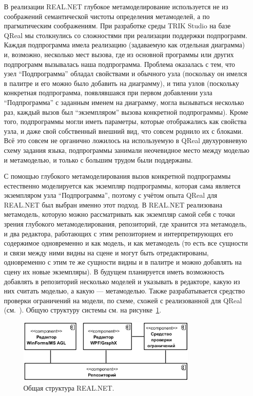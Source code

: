 \documentclass{spisok-article}
\begin{document}
В реализации REAL.NET глубокое метамоделирование используется не из соображений семантической чистоты определения метамоделей, а по прагматическим соображениям. При разработке среды TRIK Studio на базе QReal мы столкнулись со сложностями при реализации поддержки подпрограмм. Каждая подпрограмма имела реализацию (задаваемую как отдельная диаграмма) и, возможно, несколько мест вызова, где из основной программы или других подпрограмм вызывалась наша подпрограмма. Проблема оказалась с тем, что узел ``Подпрограмма'' обладал свойствами и обычного узла (поскольку он имелся в палитре и его можно было добавить на диаграмму), и типа узлов (поскольку конкретная подпрограмма, появлявшаяся при первом добавлении узла ``Подпрограмма'' с заданным именем на диаграмму, могла вызываться несколько раз, каждый вызов был ``экземпляром'' вызова конкретной подпрограммы). Кроме того, подпрограммы могли иметь параметры, которые отображались как свойства узла, и даже свой собственный внешний вид, что совсем роднило их с блоками. Всё это совсем не органично ложилось на используемую в QReal двухуровневую схему задания языка, подпрограммы занимали неочевидное место между моделью и метамоделью, и только с большим трудом были поддержаны.

С помощью глубокого метамоделирования вызов конкретной подпрограммы естественно моделируется как экземпляр подпрограммы, которая сама является экземпляром узла ``Подпрограмма'', поэтому с учётом опыта QReal для REAL.NET был выбран именно этот подход. В REAL.NET реализована метамодель, которую можно рассматривать как экземпляр самой себя с точки зрения глубокого метамоделирования, репозиторий, где хранится эта метамодель, и два редактора, работающих с этим репозиторием и интерпретирующих его содержимое одновременно и как модель, и как метамодель (то есть все сущности и связи между ними видны на сцене и могут быть отредактированы, одновременно с этим те же сущности видны и в палитре и можно добавлять на сцену их новые экземпляры). В будущем планируется иметь возможность добавлять в репозиторий несколько моделей и указывать в редакторе, какую из них считать моделью, а какую --- метамоделью. Также разрабатывается средство проверки ограничений на модели, по схеме, схожей с реализованной для QReal (см.~\cite{deripaska2013constraints}). Общую структуру системы см. на рисунке~\ref{image:architecture}.

\begin{figure}[ht]
	\centering
	\includegraphics[width=0.8\textwidth]{architecture.png}
	\caption{Общая структура REAL.NET.}
	\label{image:architecture}
\end{figure}
\end{document}
